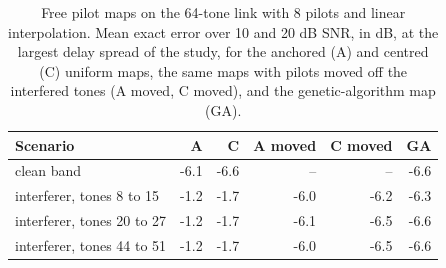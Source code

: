 \begin{table}[t]
\centering
\caption{Free pilot maps on the 64-tone link with 8 pilots and linear interpolation. Mean exact error over 10 and 20 dB SNR, in dB, at the largest delay spread of the study, for the anchored (A) and centred (C) uniform maps, the same maps with pilots moved off the interfered tones (A moved, C moved), and the genetic-algorithm map (GA).}
\label{tab:maps}
\footnotesize
\setlength{\tabcolsep}{3.5pt}
\begin{tabular}{lrrrrr}
\toprule
Scenario & A & C & A moved & C moved & GA \\
\midrule
clean band & -6.1 & -6.6 & -- & -- & -6.6 \\
interferer, tones 8 to 15 & -1.2 & -1.7 & -6.0 & -6.2 & -6.3 \\
interferer, tones 20 to 27 & -1.2 & -1.7 & -6.1 & -6.5 & -6.6 \\
interferer, tones 44 to 51 & -1.2 & -1.7 & -6.0 & -6.5 & -6.6 \\
\bottomrule
\end{tabular}
\end{table}
